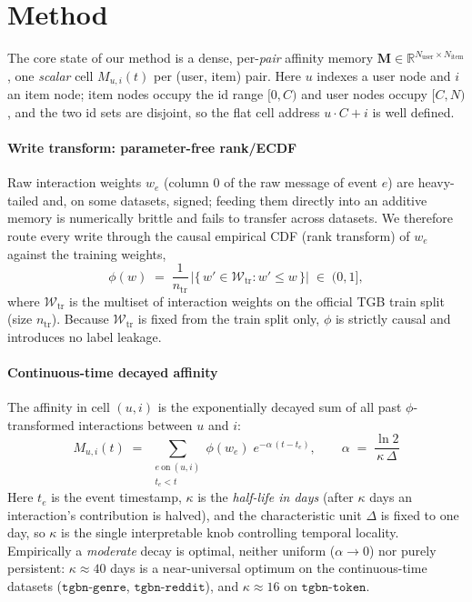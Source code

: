 \section{Method}
\label{sec:method}


The core state of our method is a dense, per-\emph{pair} affinity memory
$\mathbf{M}\in\mathbb{R}^{N_{\text{user}}\times N_{\text{item}}}$, one \emph{scalar}
cell $M_{u,i}(t)$ per (user, item) pair. Here $u$ indexes a user node and $i$ an
item node; item nodes occupy the id range $[0,C)$ and user nodes occupy $[C,N)$,
and the two id sets are disjoint, so the flat cell address $u\cdot C + i$ is
well defined.

\paragraph{Write transform: parameter-free rank/ECDF}
\label{subsec:write-transform}

Raw interaction weights $w_e$ (column $0$ of the raw message of event $e$) are
heavy-tailed and, on some datasets, signed; feeding them directly into an additive
memory is numerically brittle and fails to transfer across datasets. We therefore
route every write through the causal empirical CDF (rank transform) of $w_e$
against the training weights,
\begin{equation}
\phi(w) \;=\; \frac{1}{n_{\mathrm{tr}}}\,
\bigl|\{\, w' \in \mathcal{W}_{\mathrm{tr}} : w' \le w \,\}\bigr|
\;\in\; (0,1],
\label{eq:phi}
\end{equation}
where $\mathcal{W}_{\mathrm{tr}}$ is the multiset of interaction weights on the
official TGB train split (size $n_{\mathrm{tr}}$). Because $\mathcal{W}_{\mathrm{tr}}$
is fixed from the train split only, $\phi$ is strictly causal and introduces no
label leakage.

\paragraph{Continuous-time decayed affinity}
\label{subsec:decayed-affinity}

The affinity in cell $(u,i)$ is the exponentially decayed sum of all past
$\phi$-transformed interactions between $u$ and $i$:
\begin{equation}
M_{u,i}(t) \;=\;
\sum_{\substack{e\ \text{on}\ (u,i)\\ t_e < t}}
\phi(w_e)\; e^{-\alpha\,(t - t_e)},
\qquad
\alpha \;=\; \frac{\ln 2}{\kappa\,\Delta}
\label{eq:M}
\end{equation}
Here $t_e$ is the event timestamp, $\kappa$ is the \emph{half-life in days}
(after $\kappa$ days an interaction's contribution is halved), and the
characteristic unit $\Delta$ is fixed to one day, so $\kappa$ is the single
interpretable knob controlling temporal locality. Empirically a \emph{moderate}
decay is optimal, neither uniform ($\alpha\!\to\!0$) nor purely persistent:
$\kappa\approx 40$ days is a near-universal optimum on the continuous-time
datasets ($\texttt{tgbn-genre}$, $\texttt{tgbn-reddit}$), and $\kappa\approx 16$
on $\texttt{tgbn-token}$.

